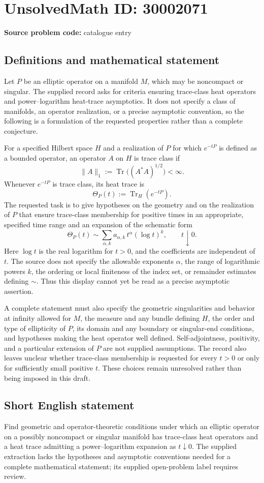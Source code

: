 \documentclass[11pt]{article}
\begin{document}
\section*{UnsolvedMath ID: 30002071}
\textbf{Source problem code:} catalogue entry
\subsection{Definitions and mathematical statement}
Let \(P\) be an elliptic operator on a manifold \(M\), which may be noncompact or singular. The supplied record asks for criteria ensuring trace-class heat operators and power--logarithm heat-trace asymptotics. It does not specify a class of manifolds, an operator realization, or a precise asymptotic convention, so the following is a formulation of the requested properties rather than a complete conjecture.

For a specified Hilbert space \(H\) and a realization of \(P\) for which \(e^{-tP}\) is defined as a bounded operator, an operator \(A\) on \(H\) is trace class if
\[
\|A\|_1:=\operatorname{Tr}\bigl((A^*A)^{1/2}\bigr)<\infty.
\]
Whenever \(e^{-tP}\) is trace class, its heat trace is
\[
\Theta_P(t):=\operatorname{Tr}_H(e^{-tP}).
\]
The requested task is to give hypotheses on the geometry and on the realization of \(P\) that ensure trace-class membership for positive times in an appropriate, specified time range and an expansion of the schematic form
\[
\Theta_P(t)\sim\sum_{\alpha,k}a_{\alpha,k}\,t^\alpha(\log t)^k,
\qquad t\downarrow0.
\]
Here \(\log t\) is the real logarithm for \(t>0\), and the coefficients are independent of \(t\). The source does not specify the allowable exponents \(\alpha\), the range of logarithmic powers \(k\), the ordering or local finiteness of the index set, or remainder estimates defining \(\sim\). Thus this display cannot yet be read as a precise asymptotic assertion.

A complete statement must also specify the geometric singularities and behavior at infinity allowed for \(M\), the measure and any bundle defining \(H\), the order and type of ellipticity of \(P\), its domain and any boundary or singular-end conditions, and hypotheses making the heat operator well defined. Self-adjointness, positivity, and a particular extension of \(P\) are not supplied assumptions. The record also leaves unclear whether trace-class membership is requested for every \(t>0\) or only for sufficiently small positive \(t\). These choices remain unresolved rather than being imposed in this draft.
\subsection{Short English statement}
Find geometric and operator-theoretic conditions under which an elliptic operator on a possibly noncompact or singular manifold has trace-class heat operators and a heat trace admitting a power--logarithm expansion as \(t\downarrow0\). The supplied extraction lacks the hypotheses and asymptotic conventions needed for a complete mathematical statement; its supplied open-problem label requires review.
\end{document}
